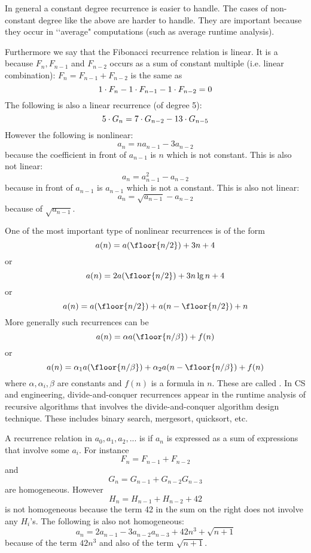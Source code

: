 In general a constant degree recurrence is easier to handle.
The cases of non-constant degree like the above are harder to
handle.
They are important because they occur in
\lq\lq average" computations (such as average runtime analysis).



Furthermore we say that the Fibonacci recurrence relation is
linear.
It is a  because
$F_n, F_{n-1}$ and $F_{n-2}$
occurs as a sum of constant multiple (i.e. linear combination):
$F_{n} = F_{n-1} + F_{n-2}$ is the same as
\[
1 \cdot F_n - 1 \cdot F_{n-1} - 1 \cdot F_{n-2} = 0\\
\]
The following is also a linear recurrence (of degree 5):
\[
5 \cdot G_n = 7 \cdot G_{n-2} - 13 \cdot G_{n-5} \\
\]
However the following is nonlinear:
\[
a_n = n a_{n-1} - 3a_{n-2}
\]
because the coefficient in front of $a_{n-1}$ is $n$ which is not constant.
This is also not linear:
\[
a_n = a_{n-1}^2 - a_{n-2}
\]
because in front of $a_{n-1}$ is $a_{n-1}$ which is not a constant.
This is also not linear:
\[
a_n = \sqrt{a_{n-1}} - a_{n-2}
\]
because of $\sqrt{a_{n-1}}$.






One of the most important type of nonlinear recurrences is of the form
\[
a(n) = a(\floor{n/2}) + 3n + 4
\]
or
\[
a(n) = 2a(\floor{n/2}) + 3n \lg n + 4
\]
or
\[
a(n) = a(\floor{n/2}) + a(n - \floor{n/2}) + n
\]
More generally such recurrences can be
\[
a(n) =  \alpha a(\floor{n/\beta}) + f(n)
\]
or
\[
a(n) =  \alpha_1 a(\floor{n/\beta}) + \alpha_2 a(n - \floor{n/\beta}) + f(n)
\]
where $\alpha, \alpha_i, \beta$ are constants and $f(n)$ is a formula in $n$.
These are called .
In CS and engineering,
divide-and-conquer recurrences appear in the runtime analysis
of recursive algorithms
that involves the divide-and-conquer algorithm design technique.
These includes binary search, mergesort, quicksort, etc.

A recurrence relation in $a_0, a_1, a_2, ...$ is  if
$a_n$ is expressed as a sum of expressions that involve some $a_i$.
For instance
\[
F_{n} = F_{n - 1} + F_{n - 2}
\]
and
\[
G_{n} = G_{n - 1} + G_{n - 2}G_{n-3}
\]
are homogeneous.
However
\[
H_{n} = H_{n - 1} + H_{n - 2} + 42
\]
is not homogeneous because the term 42 in the sum on the right does not involve
any $H_i$'s.
The following is also not homogeneous:
\[
a_n = 2 a_{n-1} - 3a_{n-2}a_{n-3} + 42n^3 + \sqrt{n + 1}
\]
because of the term $42n^3$ and also of the term $\sqrt{n + 1}$. 

